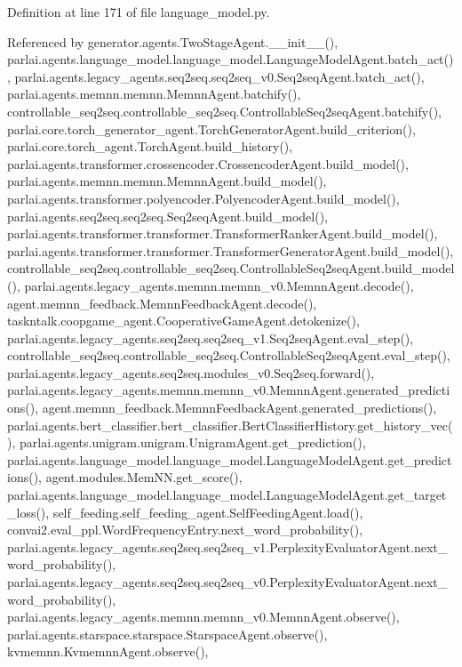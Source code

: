 Definition at line 171 of file language\+\_\+model.\+py.



Referenced by generator.\+agents.\+Two\+Stage\+Agent.\+\_\+\+\_\+init\+\_\+\+\_\+(), parlai.\+agents.\+language\+\_\+model.\+language\+\_\+model.\+Language\+Model\+Agent.\+batch\+\_\+act(), parlai.\+agents.\+legacy\+\_\+agents.\+seq2seq.\+seq2seq\+\_\+v0.\+Seq2seq\+Agent.\+batch\+\_\+act(), parlai.\+agents.\+memnn.\+memnn.\+Memnn\+Agent.\+batchify(), controllable\+\_\+seq2seq.\+controllable\+\_\+seq2seq.\+Controllable\+Seq2seq\+Agent.\+batchify(), parlai.\+core.\+torch\+\_\+generator\+\_\+agent.\+Torch\+Generator\+Agent.\+build\+\_\+criterion(), parlai.\+core.\+torch\+\_\+agent.\+Torch\+Agent.\+build\+\_\+history(), parlai.\+agents.\+transformer.\+crossencoder.\+Crossencoder\+Agent.\+build\+\_\+model(), parlai.\+agents.\+memnn.\+memnn.\+Memnn\+Agent.\+build\+\_\+model(), parlai.\+agents.\+transformer.\+polyencoder.\+Polyencoder\+Agent.\+build\+\_\+model(), parlai.\+agents.\+seq2seq.\+seq2seq.\+Seq2seq\+Agent.\+build\+\_\+model(), parlai.\+agents.\+transformer.\+transformer.\+Transformer\+Ranker\+Agent.\+build\+\_\+model(), parlai.\+agents.\+transformer.\+transformer.\+Transformer\+Generator\+Agent.\+build\+\_\+model(), controllable\+\_\+seq2seq.\+controllable\+\_\+seq2seq.\+Controllable\+Seq2seq\+Agent.\+build\+\_\+model(), parlai.\+agents.\+legacy\+\_\+agents.\+memnn.\+memnn\+\_\+v0.\+Memnn\+Agent.\+decode(), agent.\+memnn\+\_\+feedback.\+Memnn\+Feedback\+Agent.\+decode(), taskntalk.\+coopgame\+\_\+agent.\+Cooperative\+Game\+Agent.\+detokenize(), parlai.\+agents.\+legacy\+\_\+agents.\+seq2seq.\+seq2seq\+\_\+v1.\+Seq2seq\+Agent.\+eval\+\_\+step(), controllable\+\_\+seq2seq.\+controllable\+\_\+seq2seq.\+Controllable\+Seq2seq\+Agent.\+eval\+\_\+step(), parlai.\+agents.\+legacy\+\_\+agents.\+seq2seq.\+modules\+\_\+v0.\+Seq2seq.\+forward(), parlai.\+agents.\+legacy\+\_\+agents.\+memnn.\+memnn\+\_\+v0.\+Memnn\+Agent.\+generated\+\_\+predictions(), agent.\+memnn\+\_\+feedback.\+Memnn\+Feedback\+Agent.\+generated\+\_\+predictions(), parlai.\+agents.\+bert\+\_\+classifier.\+bert\+\_\+classifier.\+Bert\+Classifier\+History.\+get\+\_\+history\+\_\+vec(), parlai.\+agents.\+unigram.\+unigram.\+Unigram\+Agent.\+get\+\_\+prediction(), parlai.\+agents.\+language\+\_\+model.\+language\+\_\+model.\+Language\+Model\+Agent.\+get\+\_\+predictions(), agent.\+modules.\+Mem\+N\+N.\+get\+\_\+score(), parlai.\+agents.\+language\+\_\+model.\+language\+\_\+model.\+Language\+Model\+Agent.\+get\+\_\+target\+\_\+loss(), self\+\_\+feeding.\+self\+\_\+feeding\+\_\+agent.\+Self\+Feeding\+Agent.\+load(), convai2.\+eval\+\_\+ppl.\+Word\+Frequency\+Entry.\+next\+\_\+word\+\_\+probability(), parlai.\+agents.\+legacy\+\_\+agents.\+seq2seq.\+seq2seq\+\_\+v1.\+Perplexity\+Evaluator\+Agent.\+next\+\_\+word\+\_\+probability(), parlai.\+agents.\+legacy\+\_\+agents.\+seq2seq.\+seq2seq\+\_\+v0.\+Perplexity\+Evaluator\+Agent.\+next\+\_\+word\+\_\+probability(), parlai.\+agents.\+legacy\+\_\+agents.\+memnn.\+memnn\+\_\+v0.\+Memnn\+Agent.\+observe(), parlai.\+agents.\+starspace.\+starspace.\+Starspace\+Agent.\+observe(), kvmemnn.\+Kvmemnn\+Agent.\+observe(), 